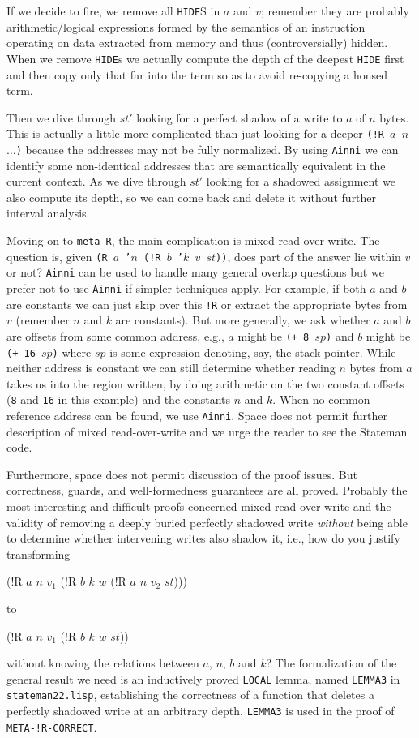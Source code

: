 \documentclass[submission,copyright,creativecommons]{eptcs}
\newcommand{\ptt}[1]{\tt{#1}}
\begin{document}
If we decide to fire, we remove all {\ptt{HIDE}}S in $a$ and $v$; remember they are
probably arithmetic/logical expressions formed by the semantics of an
instruction operating on data extracted from memory and thus
(controversially) hidden.  When we remove {\ptt{HIDE}}s we actually compute
the depth of the deepest {\ptt{HIDE}} first and then copy only that far into
the term so as to avoid re-copying a honsed term.

Then we dive through $st'$ looking for a perfect shadow of a write to $a$ of
$n$ bytes.  This is actually a little more complicated than just looking for
a deeper {\ptt{(!R $a$ $n$ $\ldots$)}} because the addresses may not be fully
normalized.  By using {\ptt{Ainni}} we can identify some non-identical
addresses that are semantically equivalent in the current context.  As we
dive through $st'$ looking for a shadowed assignment we also compute its
depth, so we can come back and delete it without further interval analysis.

Moving on to {\ptt{meta-R}}, the main complication is mixed read-over-write.
The question is, given {\ptt{(R $a$ '$n$ (!R $b$ '$k$ $v$ $st$))}}, does part of the
answer lie within $v$ or not?  {\ptt{Ainni}} can be used to handle many
general overlap questions but we prefer not to use {\ptt{Ainni}} if simpler
techniques apply.  For example, if both $a$ and $b$ are constants we can just
skip over this {\ptt{!R}} or extract the appropriate bytes from $v$ (remember
$n$ and $k$ are constants).  But more generally, we ask whether $a$ and $b$
are offsets from some common address, e.g., $a$ might be {\ptt{(+ 8 $sp$)}}
and $b$ might be {\ptt{(+ 16 $sp$)}} where $sp$ is some expression denoting,
say, the stack pointer.  While neither address is constant we can still
determine whether reading $n$ bytes from $a$ takes us into the region
written, by doing arithmetic on the two constant offsets ({\ptt{8}} and
{\ptt{16}} in this example) and the constants $n$ and $k$.  When no common
reference address can be found, we use {\ptt{Ainni}}.  Space does not permit
further description of mixed read-over-write and we urge the reader to see
the Stateman code.

Furthermore, space does not permit discussion of the proof issues.  But
correctness, guards, and well-formedness guarantees are all proved.
Probably the most interesting and difficult proofs concerned mixed
read-over-write and the validity of removing a deeply buried perfectly
shadowed write {\em{without}} being able to determine whether intervening
writes also shadow it, i.e., how do you justify transforming
\begin{acl2p}
(!R $a$ $n$ $v_1$
    (!R $b$ $k$ $w$
        (!R $a$ $n$ $v_2$ $st$)))
\end{acl2p}
to
\begin{acl2p}
(!R $a$ $n$ $v_1$
    (!R $b$ $k$ $w$ $st$))
\end{acl2p}
without knowing the relations between $a$, $n$, $b$ and $k$?  The
formalization of the general result we need is an inductively proved
{\ptt{LOCAL}} lemma, named {\ptt{LEMMA3}} in {\ptt{stateman22.lisp}},
establishing the correctness of a function that deletes a perfectly shadowed
write at an arbitrary depth.  {\ptt{LEMMA3}} is used in the proof of
{\ptt{META-!R-CORRECT}}.
\end{document}
